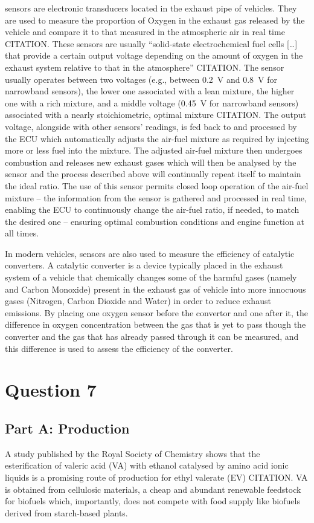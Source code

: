 \documentclass[11pt]{article}
\begin{document}
 sensors are electronic transducers located in the exhaust pipe of vehicles. They are used to measure the proportion of Oxygen in the exhaust gas released by the vehicle and compare it to that measured in the atmospheric air in real time CITATION. These sensors are usually “solid-state electrochemical fuel cells […] that provide a certain output voltage depending on the amount of oxygen in the exhaust system relative to that in the atmosphere” CITATION. The sensor usually operates between two voltages (e.g., between \SI{0.2}{\volt} and \SI{0.8}{\volt} for narrowband sensors), the lower one associated with a lean mixture, the higher one with a rich mixture, and a middle voltage (\SI{0.45}{\volt} for narrowband sensors) associated with a nearly stoichiometric, optimal mixture CITATION. The output voltage, alongside with other sensors’ readings, is fed back to and processed by the ECU which automatically adjusts the air-fuel mixture as required by injecting more or less fuel into the mixture. The adjusted air-fuel mixture then undergoes combustion and releases new exhaust gases which will then be analysed by the  sensor and the process described above will continually repeat itself to maintain the ideal ratio. The use of this sensor permits closed loop operation of the air-fuel mixture – the information from the sensor is gathered and processed in real time, enabling the ECU to continuously change the air-fuel ratio, if needed, to match the desired one – ensuring optimal combustion conditions and engine function at all times.

In modern vehicles,  sensors are also used to measure the efficiency of catalytic converters. A catalytic converter is a device typically placed in the exhaust system of a vehicle that chemically changes some of the harmful gases (namely  and Carbon Monoxide) present in the exhaust gas of vehicle into more innocuous gases (Nitrogen, Carbon Dioxide and Water) in order to reduce exhaust emissions. By placing one oxygen sensor before the convertor and one after it, the difference in oxygen concentration between the gas that is yet to pass though the converter and the gas that has already passed through it can be measured, and this difference is used to assess the efficiency of the converter.
\section*{Question 7}
\subsection*{Part A: Production}
A study published by the Royal Society of Chemistry shows that the esterification of valeric acid (VA) with ethanol catalysed by amino acid ionic liquids is a promising route of production for ethyl valerate (EV) CITATION. VA is obtained from cellulosic materials, a cheap and abundant renewable feedstock for biofuels which, importantly, does not compete with food supply like biofuels derived from starch-based plants.
\end{document}
